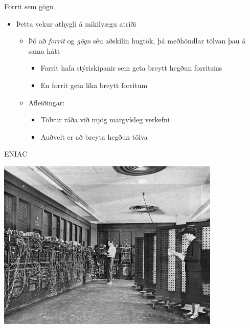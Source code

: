 \documentclass{beamer}
\begin{document}
\begin{frame}{Forrit sem gögn}
\begin{itemize}
 \item Þetta vekur athygli á mikilvægu atriði
 \begin{itemize}
  \item Þó að \emph{forrit} og \emph{gögn} séu aðskilin hugtök, þá meðhöndlar tölvan þau á sama hátt
  \begin{itemize}
   \item Forrit hafa stýriskipanir sem geta breytt hegðun forritsins
   \item En forrit geta líka breytt forritum
  \end{itemize}
  \item Afleiðingar:
  \begin{itemize}
   \item Tölvur ráða við mjög margvísleg verkefni
   \item Auðvelt er að breyta hegðun tölva
  \end{itemize}
 \end{itemize}
\end{itemize}
\end{frame}

\begin{frame}{ENIAC}
\begin{center}
\includegraphics[width=0.8\textwidth]{Pics/eniac}
\end{center}
\end{frame}
\end{document}

